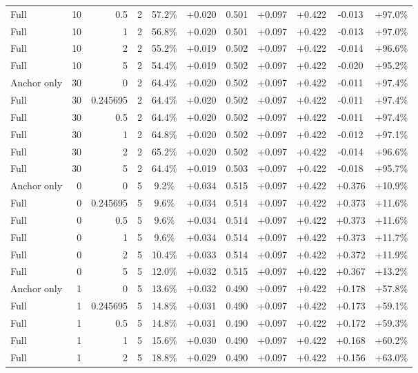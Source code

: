 \begin{table}[htbp]
\begin{tabular}{lrrrccccccc}
Full & 10 & 0.5 & 2 & 57.2\% & +0.020 & 0.501 & +0.097 & +0.422 & -0.013 & +97.0\% \\
Full & 10 & 1 & 2 & 56.8\% & +0.020 & 0.501 & +0.097 & +0.422 & -0.013 & +97.0\% \\
Full & 10 & 2 & 2 & 55.2\% & +0.019 & 0.502 & +0.097 & +0.422 & -0.014 & +96.6\% \\
Full & 10 & 5 & 2 & 54.4\% & +0.019 & 0.502 & +0.097 & +0.422 & -0.020 & +95.2\% \\
Anchor only & 30 & 0 & 2 & 64.4\% & +0.020 & 0.502 & +0.097 & +0.422 & -0.011 & +97.4\% \\
Full & 30 & 0.245695 & 2 & 64.4\% & +0.020 & 0.502 & +0.097 & +0.422 & -0.011 & +97.4\% \\
Full & 30 & 0.5 & 2 & 64.4\% & +0.020 & 0.502 & +0.097 & +0.422 & -0.011 & +97.4\% \\
Full & 30 & 1 & 2 & 64.8\% & +0.020 & 0.502 & +0.097 & +0.422 & -0.012 & +97.1\% \\
Full & 30 & 2 & 2 & 65.2\% & +0.020 & 0.502 & +0.097 & +0.422 & -0.014 & +96.6\% \\
Full & 30 & 5 & 2 & 64.4\% & +0.019 & 0.503 & +0.097 & +0.422 & -0.018 & +95.7\% \\
Anchor only & 0 & 0 & 5 & 9.2\% & +0.034 & 0.515 & +0.097 & +0.422 & +0.376 & +10.9\% \\
Full & 0 & 0.245695 & 5 & 9.6\% & +0.034 & 0.514 & +0.097 & +0.422 & +0.373 & +11.6\% \\
Full & 0 & 0.5 & 5 & 9.6\% & +0.034 & 0.514 & +0.097 & +0.422 & +0.373 & +11.6\% \\
Full & 0 & 1 & 5 & 9.6\% & +0.034 & 0.514 & +0.097 & +0.422 & +0.373 & +11.7\% \\
Full & 0 & 2 & 5 & 10.4\% & +0.033 & 0.514 & +0.097 & +0.422 & +0.372 & +11.9\% \\
Full & 0 & 5 & 5 & 12.0\% & +0.032 & 0.515 & +0.097 & +0.422 & +0.367 & +13.2\% \\
Anchor only & 1 & 0 & 5 & 13.6\% & +0.032 & 0.490 & +0.097 & +0.422 & +0.178 & +57.8\% \\
Full & 1 & 0.245695 & 5 & 14.8\% & +0.031 & 0.490 & +0.097 & +0.422 & +0.173 & +59.1\% \\
Full & 1 & 0.5 & 5 & 14.8\% & +0.031 & 0.490 & +0.097 & +0.422 & +0.172 & +59.3\% \\
Full & 1 & 1 & 5 & 15.6\% & +0.030 & 0.490 & +0.097 & +0.422 & +0.168 & +60.2\% \\
Full & 1 & 2 & 5 & 18.8\% & +0.029 & 0.490 & +0.097 & +0.422 & +0.156 & +63.0\% \\

\end{tabular}
\end{table}
